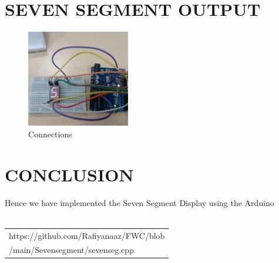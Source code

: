 \documentclass[journal,12pt,twocolumn]{IEEEtran}
\begin{document}
\section{SEVEN SEGMENT OUTPUT}
\begin{figure}[H]
\centering
\includegraphics[width=0.4\textwidth]{1.jpg}
\caption{Connections}
\label{fig:connection.jpg}
\end{figure}

    \section{CONCLUSION}
    Hence we have implemented the Seven Segment Display using the Arduino \\
    \\
    \begin{tabularx}{0.46\textwidth} { 
  | >{\centering\arraybackslash}X |}
  \hline
   https://github.com/Rafiyanaaz/FWC/blob\\ /main/Sevensegment/sevenseg.cpp\\
  \hline
\end{tabularx}

 
\end{document}
